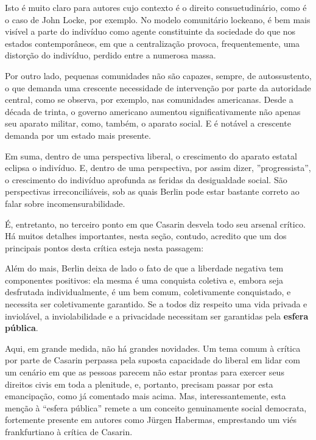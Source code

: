 \documentclass[12pt,a4paper]{article}
\newenvironment{citac}
{
	
	\par\setlength{\leftskip}{4cm}\noindent\ignorespaces
	\footnotesize}{\normalfont
	\par

}
\begin{document}
	Isto é muito claro para autores cujo contexto é o direito 
	consuetudinário, como é o caso de John Locke, por exemplo. 
	No modelo comunitário lockeano, é bem mais visível a parte 
	do indivíduo como agente constituinte da sociedade do que nos 
	estados contemporâneos, em que a centralização provoca, 
	frequentemente, uma distorção do indivíduo, perdido entre a 
	numerosa massa. 

	Por outro lado, pequenas comunidades não são capazes, sempre, de 
	autossustento, o que demanda uma crescente necessidade de intervenção 
	por parte da autoridade central, como se observa, por exemplo, nas 
	comunidades americanas. Desde a década de trinta, o governo americano 
	aumentou significativamente não apenas seu aparato militar, como, 
	também, o aparato social. E é notável a crescente demanda por 
	um estado mais presente. 

	Em suma, dentro de uma perspectiva liberal, o crescimento do aparato 
	estatal eclipsa o indivíduo. E, dentro de uma perspectiva, por assim 
	dizer, ”progressista”, o crescimento do indivíduo aprofunda as feridas 
	da desigualdade social. São perspectivas irreconciliáveis, sob as quais 
	Berlin pode estar bastante correto ao falar sobre incomensurabilidade. 

	É, entretanto, no terceiro ponto em que Casarin desvela todo seu 
	arsenal crítico. Há muitos detalhes importantes, nesta seção, contudo, 
	acredito que um dos principais pontos desta crítica esteja nesta 
	passagem: 

	\begin{citac}
		Além do mais, Berlin deixa de lado o fato de
		que a liberdade negativa tem componentes positivos: 
		ela mesma é uma conquista coletiva e, embora seja 
		desfrutada individualmente, é um bem comum, coletivamente 
		conquistado, e necessita ser coletivamente garantido. 
		Se a todos diz respeito uma vida privada e inviolável, 
		a inviolabilidade e a privacidade necessitam 
		ser garantidas pela \textbf{esfera pública}.
	\end{citac}

	Aqui, em grande medida, não há grandes novidades. Um tema comum à 
	crítica por parte de Casarin perpassa pela suposta capacidade 
	do liberal em lidar com um cenário em que as pessoas parecem não 
	estar prontas para exercer seus direitos civis em toda a plenitude, 
	e, portanto, precisam passar por esta emancipação, como já 
	comentado mais acima. Mas, interessantemente, esta menção à 
	“esfera pública” remete a um conceito genuinamente social democrata, 
	fortemente presente em autores como Jürgen Habermas, emprestando um 
	viés frankfurtiano à crítica de Casarin. 
\end{document}
